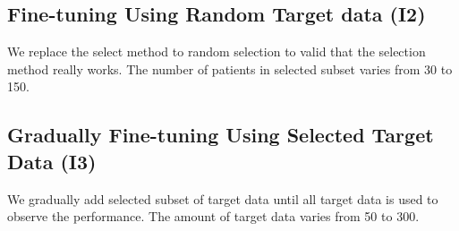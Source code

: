 \subsection{Fine-tuning Using Random Target data (I2)}
We replace the select method to random selection to valid that the selection method really works. The number of patients in selected subset varies from 30 to 150.

\subsection{Gradually Fine-tuning Using Selected Target Data (I3)}
We gradually add selected subset of target data until all target data is used to observe the performance. The amount of target data varies from 50 to 300.